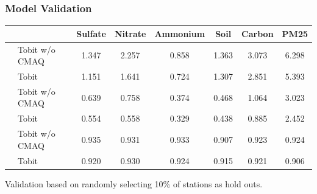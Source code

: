 \documentclass[t]{beamer}\usepackage[]{graphicx}\usepackage[]{color}
\begin{document}

\begin{frame}
\frametitle{Model Validation}

\vfill

{\footnotesize
\begin{center}
\renewcommand*{\arraystretch}{1.5}
\begin{tabular}{l|l|cccccc}
    & & Sulfate & Nitrate & Ammonium & Soil & Carbon & PM25 \\
\hline
\parbox[t]{2mm}{}
& Tobit w/o CMAQ & 1.347 & 2.257 & 0.858 & 1.363 & 3.073 & 6.298 \\
& Tobit          & 1.151 & 1.641 & 0.724 & 1.307 & 2.851 & 5.393  \\
\hline
\parbox[t]{2mm}{}
& Tobit w/o CMAQ & 0.639 & 0.758 & 0.374 & 0.468 & 1.064 & 3.023  \\
& Tobit          & 0.554 & 0.558 & 0.329 & 0.438 & 0.885 & 2.452  \\
\hline
\parbox[t]{2mm}{}
& Tobit w/o CMAQ & 0.935 & 0.931 & 0.933 & 0.907 & 0.923 & 0.924  \\
& Tobit          & 0.920 & 0.930 & 0.924 & 0.915 & 0.921 & 0.906  \\
\hline
\end{tabular}
\end{center}
}

\vfill\vfill

Validation based on randomly selecting 10\% of stations as hold outs.

\end{frame}

\end{document}
